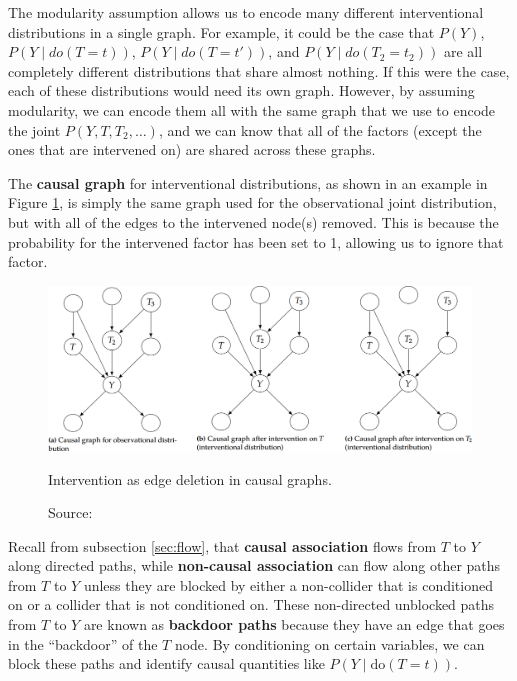 The modularity assumption allows us to encode many different interventional
distributions in a single graph. For example, it could be the case that
\( P(Y) \), \( P(Y \mid do(T = t)) \), \( P(Y \mid do(T = t')) \), and
\( P(Y \mid do(T_2 = t_2)) \) are all completely different distributions that
share almost nothing. If this were the case, each of these distributions would
need its own graph. However, by assuming modularity, we can encode them all
with the same graph that we use to encode the joint \( P(Y, T, T_2, \ldots) \),
and we can know that all of the factors (except the ones that are intervened on)
are shared across these graphs.

The \textbf{causal graph} for interventional distributions,
as shown in an example in Figure \ref{fig:intervention},
is simply the same graph used for the observational joint distribution,
but with all of the edges to the intervened node(s) removed.
This is because the probability for the intervened factor has been set to 1,
allowing us to ignore that factor.

\begin{figure}[h]
    \centering
    \includegraphics[width=\textwidth]{figures/ch3/21.intervention.png}
    \caption{Intervention as edge deletion in causal graphs.}
    \vspace{-10px}
    \caption*{\scriptsize{Source: \cite{Neal_2020a}}}
    \label{fig:intervention}
\end{figure}

Recall from subsection \ref{sec:flow}, that \textbf{causal association}
flows from \( T \) to \( Y \) along directed paths,
while \textbf{non-causal association} can flow along other
paths from \( T \) to \( Y \) unless they are blocked by either
a non-collider that is conditioned on or a collider that is not
conditioned on. These non-directed unblocked paths from
\( T \) to \( Y \) are known as \textbf{backdoor paths}
because they have an edge that goes in the ``backdoor'' of the \( T \) node.
By conditioning on certain variables, we can block these paths and
identify causal quantities like \( P(Y \mid \text{do}(T = t)) \).

